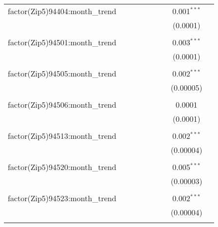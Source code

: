 \begin{table}[H]
{\begin{tabular}{@{\extracolsep{5pt}}lcccccccc}
  factor(Zip5)94404:month\_trend &  &  &  &  &  &  & 0.001$^{***}$ &  \\  

   &  &  &  &  &  &  & (0.0001) &  \\  

   & & & & & & & & \\  

  factor(Zip5)94501:month\_trend &  &  &  &  &  &  & 0.003$^{***}$ &  \\  

   &  &  &  &  &  &  & (0.0001) &  \\  

   & & & & & & & & \\  

  factor(Zip5)94505:month\_trend &  &  &  &  &  &  & 0.002$^{***}$ &  \\  

   &  &  &  &  &  &  & (0.00005) &  \\  

   & & & & & & & & \\  

  factor(Zip5)94506:month\_trend &  &  &  &  &  &  & 0.0001 &  \\  

   &  &  &  &  &  &  & (0.0001) &  \\  

   & & & & & & & & \\  

  factor(Zip5)94513:month\_trend &  &  &  &  &  &  & 0.002$^{***}$ &  \\  

   &  &  &  &  &  &  & (0.00004) &  \\  

   & & & & & & & & \\  

  factor(Zip5)94520:month\_trend &  &  &  &  &  &  & 0.005$^{***}$ &  \\  

   &  &  &  &  &  &  & (0.00003) &  \\  

   & & & & & & & & \\  

  factor(Zip5)94523:month\_trend &  &  &  &  &  &  & 0.002$^{***}$ &  \\  

   &  &  &  &  &  &  & (0.00004) &  \\  

   & & & & & & & & \\  


\end{tabular}}
\end{table}
